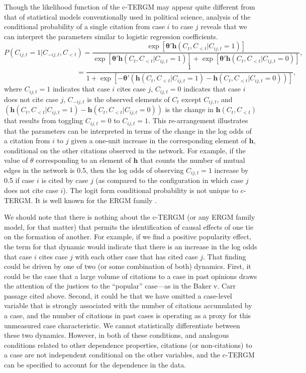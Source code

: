 \documentclass[headsepline=true, abstracton]{scrartcl}
\begin{document}
Though the likelihood function of the c-TERGM may appear quite different from that of statistical models conventionally used in political science, analysis of the conditional probability of a single citation from case $i$ to case $j$ reveals that we can interpret the parameters similar to logistic regression coefficients. $$ P(C_{ij,t} = 1 | C_{-ij,t}, C_{ < t}) = \frac{\exp \left[ {\bm{\theta}'\bm{h}(C_{t},C_{<t}| C_{ij,t} = 1) } \right]}{ \exp \left[ {\bm{\theta}'\bm{h}(C_{t},C_{<t}| C_{ij,t} = 1) } \right] + \exp \left[ {\bm{\theta}'\bm{h}(C_{t},C_{<t}| C_{ij,t} = 0) } \right]}, $$ $$ \text{~~~~~~~~~~~~~~~~~~~~~~~~~~~~~~~} = \frac{1}{ 1 + \exp \left[ - {\bm{\theta}'\left(\bm{h}(C_{t},C_{<t}| C_{ij,t} = 1) - \bm{h}(C_{t},C_{<t}| C_{ij,t} = 0)\right)} \right]}, $$
where $C_{ij,t} = 1$ indicates that case $i$ cites case $j$, $C_{ij,t} = 0$ indicates that case $i$ does not cite case $j$, $C_{-ij,t}$ is the observed elements of $C_{t}$ except $C_{ij,t}$, and $\left(\bm{h}(C_{t},C_{<t}| C_{ij,t} = 1) - \bm{h}(C_{t},C_{<t}| C_{ij,t} = 0)\right)$ is the change in $\bm{h}(C_{t},C_{<t})$ that results from toggling $C_{ij,t} = 0$ to $C_{ij,t} = 1$. This re-arrangement illustrates that the parameters can be interpreted in terms of the change in the log odds of a citation from $i$ to $j$ given a one-unit increase in the corresponding element of $\bm{h}$, conditional on the other citations observed in the network. For example, if the value of $\theta$ corresponding to an element of $\bm{h}$ that counts the number of mutual edges in the network is 0.5, then the log odds of observing $C_{ij,t} = 1$ increase by 0.5 if case $i$ is cited by case $j$ (as compared to the configuration in which case $j$ does not cite case $i$). The logit form conditional probability is not unique to c-TERGM. It is well known for the ERGM family \citep{goodreau2009birds}.

We should note that there is nothing about the c-TERGM (or any ERGM family model, for that matter) that permits the identification of causal effects of one tie on the formation of another. For example, if we find a positive popularity effect, the term for that dynamic would indicate that there is an increase in the log odds that case $i$ cites case $j$ with each other case that has cited case $j$.  That finding could be driven by one of two (or some combination of both) dynamics. First, it could be the case that a large volume of citations to a case in past opinions draws the attention of the justices to the ``popular'' case---as in the Baker v. Carr passage cited above. Second, it could be that we have omitted a case-level variable that is strongly associated with the number of citations accumulated by a case, and the number of citations in past cases is operating as a proxy for this unmeasured case characteristic. We cannot statistically differentiate between these two dynamics. However, in both of these conditions, and analogous conditions related to other dependence properties, citations (or non-citations) to a case are not independent conditional on the other variables, and the c-TERGM can be specified to account for the dependence in the data.
\end{document}

